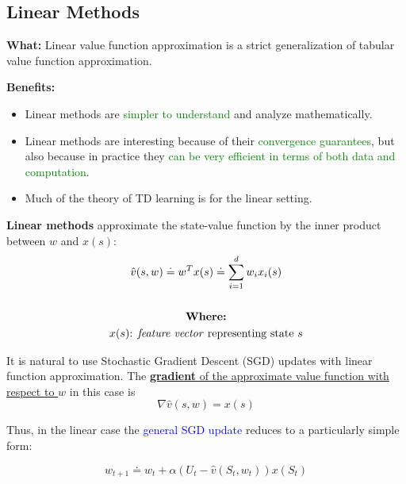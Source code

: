 \documentclass[12pt, a4paper]{article}
\begin{document}
\subsection{Linear Methods}\label{linear-methods}

\textbf{What:} Linear value function approximation is a strict generalization of tabular value function approximation.


\textbf{Benefits:}
\begin{itemize}
  \item Linear methods are \textcolor{Green}{simpler to understand} and analyze mathematically.
  \item Linear methods are interesting because of their \textcolor{Green}{convergence guarantees}, but also because in practice they \textcolor{Green}{can be very efficient in terms of both data and computation}.
  \item Much of the theory of TD learning is for the linear setting.
\end{itemize}


\textbf{Linear methods} approximate the state-value function by the inner product between $w$ and $x(s)$:
\begin{gather*}
  \hat{v}(s,w) \doteq w^T x(s) \doteq \sum_{i=1}^d w_i x_i (s) \\ \\
  \textbf{Where:} \\
  x(s) \text{: \textit{feature vector} representing state $s$}
\end{gather*}

It is natural to use Stochastic Gradient Descent (SGD) updates with linear function approximation. The \uline{\textbf{gradient} of the approximate value function with respect to $w$} in this case is
$$
\nabla \hat{v}(s,w) = x(s)
$$

Thus, in the linear case the \textcolor{blue}{general SGD update} reduces to a particularly simple form:

$$
w_{t+1} \doteq w_t + \alpha (U_t - \hat{v}(S_t,w_t)) x(S_t)
$$
\end{document}
